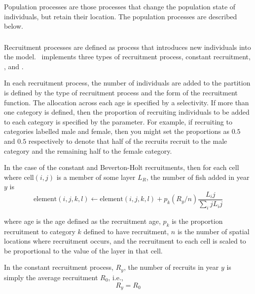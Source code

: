 Population processes are those processes that change the population state of individuals, but retain their location. The population processes are described below.

\subsubsection{}

\TODO

Recruitment processes are defined as  process that introduces new individuals into the model. \SPM\ implements three types of recruitment process, constant recruitment,   \citep{1203}\NYI, and  \citep{1203}\NYI. 

In each recruitment process, the number of individuals are added to the partition is defined by the type of recruitment process and the form of the recruitment function. The allocation across each age is specified by a selectivity. If more than one category is defined, then the proportion of recruiting individuals to be added to each category is specified by the  parameter. For example, if recruiting to categories labelled male and female, then you might set the proportions as $0.5$ and $0.5$ respectively to denote that half of the recruits recruit to the male category and the remaining half to the female category.

In the case of the constant and Beverton-Holt recruitments, then for each cell where cell$(i,j)$ is a member of some layer $L_R$, the  number of fish added in year $y$ is 
\begin{equation}
  \text{element}(i,j,k,l) \leftarrow \text{element}(i,j,k,l) + p_k(R_y / n) \frac{L_ij}{\sum_ij L_ij}
\end{equation}

where age is the age defined as the recruitment age, $p_k$ is the proportion recruitment to category $k$ defined to have recruitment, $n$ is the number of spatial locations where recruitment occurs, and the recruitment to each cell is scaled to be proportional to the value of the layer in that cell.

In the constant recruitment process, $R_y$, the number of recruits in year $y$ is simply the average recruitment $R_0$, i.e.,
\begin{equation}
  R_y = R_0
\end{equation}


